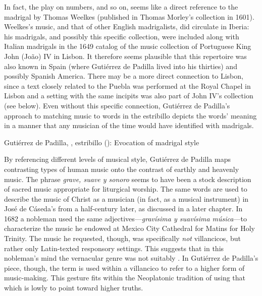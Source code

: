 In fact, the play on numbers,  and so on, seems like a
direct reference to the madrigal  by Thomas Weelkes (published in Thomas Morley's collection
 in 1601).
Weelkes's music, and that of other English madrigalists, did circulate in
Iberia: his madrigals, and possibly this specific collection, were included
along with Italian madrigals in the 1649 catalog of the music collection of
Portuguese King John (João) IV in Lisbon.%
    \Autocite[, 584]{JohnIV:Catalog}
It therefore seems plausible that this repertoire was also known in Spain (where
Gutiérrez de Padilla lived into his thirties) and possibly Spanish America.
There may be a more direct connection to Lisbon, since a text closely related to
the Puebla  was performed at the Royal Chapel in Lisbon and a
setting with the same incipits was also part of John IV's collection (see
below).
Even without this specific connection, Gutiérrez de Padilla's approach to
matching music to words in the estribillo depicts the words' meaning in a manner
that any musician of the time would have identified with madrigals.

\begin{musicexample}
    \caption{Gutiérrez de Padilla, , estribillo
    (): Evocation of madrigal style}

    \label{music:Padilla-Voces-madrigal}
\end{musicexample}

By referencing different levels of musical style, Gutiérrez de Padilla maps
contrasting types of human music onto the contrast of earthly and heavenly
music.
The phrase \emph{grave, suave y sonoro} seems to have been a stock description
of sacred music appropriate for liturgical worship.%
    \Autocite
    [On \emph{suave} and other common vocabulary used for music in Spanish
    poetry of the period, see][]{UribeBracho:OrfeoPhD}
The same words are used to describe the music of Christ as a musician (in fact,
as a musical instrument) in José de Cáseda's  from a
half-century later, as discussed in a later chapter. %
In 1682 a nobleman used the same adjectives---\emph{gravísima y suavísima
música}---to characterize the music he endowed at Mexico City Cathedral for
Matins for Holy Trinity.%
    \Autocite[140--141]{Goldman:Responsory}
The music he requested, though, was specifically \emph{not} villancicos, but
rather only Latin-texted responsory settings.
This suggests that in this nobleman's mind the vernacular genre was not suitably
.
In Gutiérrez de Padilla's piece, though, the term is used within a villancico to
refer to a higher form of music-making. 
This gesture fits within the Neoplatonic tradition of using that which is lowly
to point toward higher truths.

